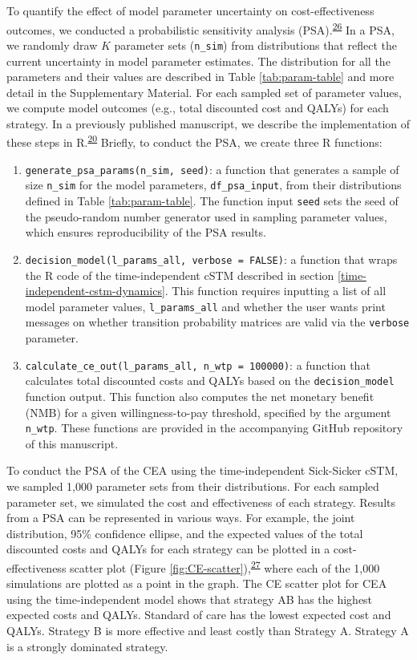 \documentclass[
]{article}
\begin{document}
To quantify the effect of model parameter uncertainty on cost-effectiveness outcomes, we conducted a probabilistic sensitivity analysis (PSA).\textsuperscript{\protect\hyperlink{ref-Briggs2012}{26}} In a PSA, we randomly draw \(K\) parameter sets (\texttt{n\_sim}) from distributions that reflect the current uncertainty in model parameter estimates. The distribution for all the parameters and their values are described in Table \ref{tab:param-table} and more detail in the Supplementary Material. For each sampled set of parameter values, we compute model outcomes (e.g., total discounted cost and QALYs) for each strategy. In a previously published manuscript, we describe the implementation of these steps in R.\textsuperscript{\protect\hyperlink{ref-Alarid-Escudero2019e}{20}} Briefly, to conduct the PSA, we create three R functions:

\begin{enumerate}
\def\labelenumi{\arabic{enumi}.}
\item
  \texttt{generate\_psa\_params(n\_sim,\ seed)}: a function that generates a sample of size \texttt{n\_sim} for the model parameters, \texttt{df\_psa\_input}, from their distributions defined in Table \ref{tab:param-table}. The function input \texttt{seed} sets the seed of the pseudo-random number generator used in sampling parameter values, which ensures reproducibility of the PSA results.
\item
  \texttt{decision\_model(l\_params\_all,\ verbose\ =\ FALSE)}: a function that wraps the R code of the time-independent cSTM described in section \ref{time-independent-cstm-dynamics}. This function requires inputting a list of all model parameter values, \texttt{l\_params\_all} and whether the user wants print messages on whether transition probability matrices are valid via the \texttt{verbose} parameter.
\item
  \texttt{calculate\_ce\_out(l\_params\_all,\ n\_wtp\ =\ 100000)}: a function that calculates total discounted costs and QALYs based on the \texttt{decision\_model} function output. This function also computes the net monetary benefit (NMB) for a given willingness-to-pay threshold, specified by the argument \texttt{n\_wtp}.
  These functions are provided in the accompanying GitHub repository of this manuscript.
\end{enumerate}

To conduct the PSA of the CEA using the time-independent Sick-Sicker cSTM, we sampled 1,000 parameter sets from their distributions. For each sampled parameter set, we simulated the cost and effectiveness of each strategy. Results from a PSA can be represented in various ways. For example, the joint distribution, 95\% confidence ellipse, and the expected values of the total discounted costs and QALYs for each strategy can be plotted in a cost-effectiveness scatter plot (Figure \ref{fig:CE-scatter}),\textsuperscript{\protect\hyperlink{ref-Briggs2002}{27}} where each of the 1,000 simulations are plotted as a point in the graph. The CE scatter plot for CEA using the time-independent model shows that strategy AB has the highest expected costs and QALYs. Standard of care has the lowest expected cost and QALYs. Strategy B is more effective and least costly than Strategy A. Strategy A is a strongly dominated strategy.
\end{document}
